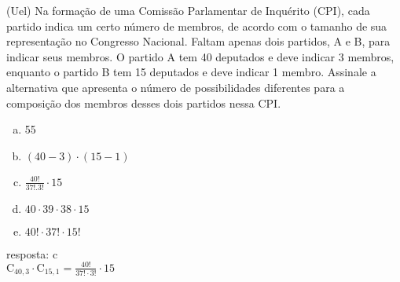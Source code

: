 \begin{ex}
(Uel) Na formação de uma Comissão Parlamentar de Inquérito (CPI), cada partido indica um certo número de membros, de acordo com o tamanho de sua representação no Congresso Nacional. Faltam apenas dois partidos, A e B, para indicar seus membros. O partido A tem 40 deputados e deve indicar 3 membros, enquanto o partido B tem 15 deputados e deve indicar 1 membro. Assinale a alternativa que apresenta o número de possibilidades diferentes para a composição dos membros desses dois partidos nessa CPI.
   \begin{enumerate}[(a)]
   \item 55
   \item $(40 - 3)\cdot(15 - 1)$
   \item $\frac{40!}{37!.3!}\cdot 15$
   \item $40\cdot39\cdot38\cdot15$
   \item $40!\cdot37!\cdot15!$
   \end{enumerate}
     \begin{sol}
      resposta: c \\
      $\mathrm{C}_{{40},3}\cdot \mathrm{C}_{{15},1}=\frac{40!}{37!\cdot3!}\cdot15$
     \end{sol}
\end{ex}